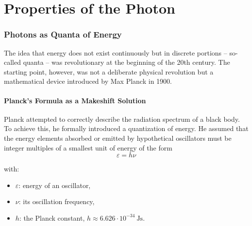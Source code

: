 \chapter{Properties of the Photon}

\setcounter{section}{3}
\setcounter{subsection}{0}
\setcounter{subsubsection}{1}
\setcounter{secnumdepth}{3}

\subsection{Photons as Quanta of Energy}

The idea that energy does not exist continuously but in discrete portions – so-called quanta – was revolutionary at the beginning of the 20th century. The starting point, however, was not a deliberate physical revolution but a mathematical device introduced by Max Planck in 1900.

\subsubsection{Planck's Formula as a Makeshift Solution}

Planck attempted to correctly describe the radiation spectrum of a black body. To achieve this, he formally introduced a quantization of energy. He assumed that the energy elements absorbed or emitted by hypothetical oscillators must be integer multiples of a smallest unit of energy of the form
$$
\varepsilon = h \nu
$$

with:
\begin{itemize}
	\item $\varepsilon$: energy of an oscillator,
	\item $\nu$: its oscillation frequency,
	\item $h$: the Planck constant, $h \approx 6.626 \cdot 10^{-34}~\mathrm{Js}$.
\end{itemize}

